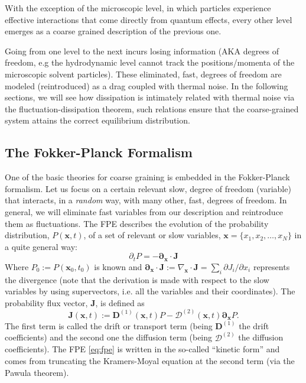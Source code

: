 \documentclass[ twoside,openright,titlepage,numbers=noenddot,%
headinclude,footinclude,cleardoublepage=empty,abstract=on,
BCOR=5mm,paper=a4,fontsize=11pt, dvipsnames
]{scrreprt}
\renewcommand{\vec}[1]{\bm{#1}}
\newcommand{\tens}[1]{\bm{\mathcal{#1}}}
\begin{document}
With the exception of the microscopic level, in which particles experience effective interactions that come directly from quantum effects, every other level emerges as a coarse grained description of the previous one. 

Going from one level to the next incurs losing information (AKA degrees of freedom, e.g the hydrodynamic level cannot track the positions/momenta of the microscopic solvent particles). These eliminated, fast, degrees of freedom are modeled (reintroduced) as a drag coupled with thermal noise. In the following sections, we will see how dissipation is intimately related with thermal noise via the fluctuation-dissipation theorem, such relations ensure that the coarse-grained system attains the correct equilibrium distribution.


\subsection{The Fokker-Planck Formalism}\label{sec:fpe}
One of the basic theories for coarse graining is embedded in the Fokker-Planck formalism. Let us focus on a certain relevant slow, degree of freedom (variable) that interacts, in a \emph{random} way, with many other, fast, degrees of freedom. In general, we will eliminate fast variables from our description and reintroduce them as fluctuations. The \gls{FPE} describes the evolution of the probability distribution, $P(\vec{x},t)$, of a set of relevant or slow variables, $\vec{x} = \{x_1, x_2,\dots, x_N\}$ in a quite general way:
  \begin{equation}
    \label{eq:fpe}
    \partial_t P = -\vec{\partial}_{\vec{x}}\cdot \vec{J}
  \end{equation}
Where $P_0 := P(\vec{x}_0, t_0)$ is known and $\vec{\partial}_{\vec{x}}\cdot \vec{J} := \nabla_{\vec{x}}\cdot\vec{J} = \sum_i\partial J_i/\partial x_i  $ represents the divergence (note that the derivation is made with respect to the slow variables by using supervectors, i.e. all the variables and their coordinates\cite{Dhont1996}).
The probability flux vector, $\vec{J}$, is defined as
\begin{equation}
  \label{eq:fpeflux}
  \vec{J}(\vec{x}, t) := \vec{D}^{(1)}(\vec{x},t)P - \tens{D}^{(2)}(\vec{x}, t) \vec{\partial}_{\vec{x}} P.
\end{equation}
The first term is called the drift or transport term (being $\vec{D}^{(1)}$ the drift coefficients) and the second one the diffusion term (being $\tens{D}^{(2)}$ the diffusion coefficients). The \gls{FPE} \eqref{eq:fpe} is written in the so-called ``kinetic form'' and comes from truncating the Kramers-Moyal equation at the second term (via the Pawula theorem)\cite{Risken2012}.
\end{document}
